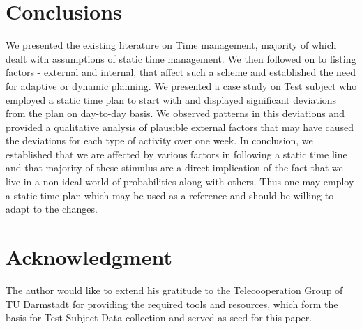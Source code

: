 \documentclass[conference]{IEEEtran}
\begin{document}
\section{Conclusions}
We presented the existing literature on Time management, majority of which dealt with assumptions of static time management. We then followed on to listing factors - external and internal, that affect such a scheme and established the need for adaptive or dynamic planning. We presented a case study on Test subject who employed a static time plan to start with and displayed significant deviations from the plan on day-to-day basis. We observed patterns in this deviations and provided a qualitative analysis of plausible external factors that may have caused the deviations for each type of activity over one week. In conclusion, we established that we are affected by various factors in following a static time line and that majority of these stimulus are a direct implication of the fact that we live in a non-ideal world of probabilities along with others. Thus one may employ a static time plan which may be used as a reference and should be willing to adapt to the changes.

\section*{Acknowledgment}
The author would like to extend his gratitude to the Telecooperation Group of TU Darmstadt for providing the required tools and resources, which form the basis for Test Subject Data collection and served as seed for this paper.



\end{document}
